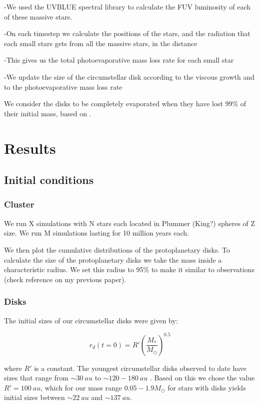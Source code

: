 \documentclass[fleqn,usenatbib]{mnras}
\begin{document}
-We used the UVBLUE spectral library to calculate the FUV luminosity of each of these massive stars.

-On each timestep we calculate the positions of the stars, and the radiation that each small stars gets from all the massive stars, in the distance

-This gives us the total photoevaporative mass loss rate for each small star

-We update the size of the circumstellar disk according to the viscous growth and to the photoevaporative mass loss rate


We consider the disks to be completely evaporated when they have lost 99\% of their initial mass, based on \citet{anderson2013}.

\section{Results}
\label{sec:results}

\subsection{Initial conditions}
\subsubsection{Cluster}
We run X simulations with N stars each located in Plummer (King?) spheres of Z size. We run M simulations lasting for 10 million years each. 

We then plot the cumulative distributions of the protoplanetary disks. To calculate the size of the protoplanetary disks we take the mass inside a characteristic radius. We set this radius to 95\% to make it similar to observations (check reference on my previous paper).

\subsubsection{Disks}
The initial sizes of our circumstellar disks were given by:

\begin{equation}
r_d(t=0) = R'\left(\frac{M_*}{M_\odot}\right)^{0.5}
\end{equation}

\noindent
where $R'$ is a constant. The youngest circumstellar disks observed to date have sizes that range from $\sim\SI{30}{au}$ \citep[e.g.][]{lee2018} to $\sim120-\SI{180}{au}$ \citep[e.g.][]{murillo2013,vanthoff2018}. Based on this we chose the value $R' = \SI{100}{au}$, which for our mass range $0.05-1.9 M_\odot$ for stars with disks yields initial sizes between $\sim\SI{22}{au}$ and $\sim\SI{137}{au}$.
\end{document}
